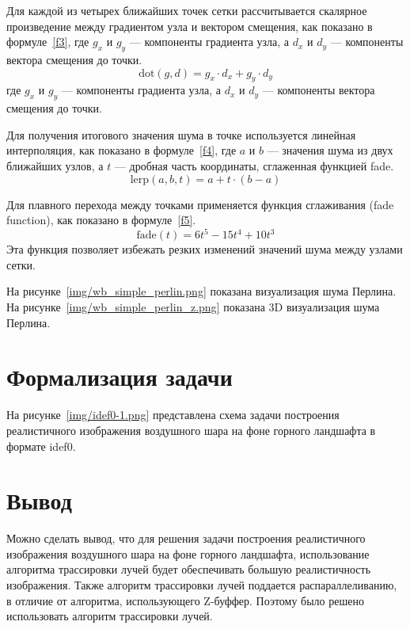 Для каждой из четырех ближайших точек сетки рассчитывается скалярное произведение между градиентом узла и вектором смещения, как показано в формуле~\ref{f3}, где $g_x$ и $g_y$ — компоненты градиента узла, а $d_x$ и $d_y$ — компоненты вектора смещения до точки.
\begin{equation}
\text{dot}(g, d) = g_x \cdot d_x + g_y \cdot d_y
\label{f3}
\end{equation}
где $g_x$ и $g_y$ — компоненты градиента узла, а $d_x$ и $d_y$ — компоненты вектора смещения до точки.

Для получения итогового значения шума в точке используется линейная интерполяция, как показано в формуле~\ref{f4}, где $a$ и $b$ — значения шума из двух ближайших узлов, а $t$ — дробная часть координаты, сглаженная функцией fade.
\begin{equation}
\text{lerp}(a, b, t) = a + t \cdot (b - a)
\label{f4}
\end{equation}


Для плавного перехода между точками применяется функция сглаживания (fade function), как показано в формуле~\ref{f5}.
\begin{equation}
\text{fade}(t) = 6t^5 - 15t^4 + 10t^3
\label{f5}
\end{equation}
Эта функция позволяет избежать резких изменений значений шума между узлами сетки.

На рисунке~\ref{img/wb_simple_perlin.png} показана визуализация шума Перлина. На рисунке~\ref{img/wb_simple_perlin_z.png} показана 3D визуализация шума Перлина.



\section{Формализация задачи}
На рисунке~\ref{img/idef0-1.png} представлена схема задачи построения реалистичного изображения воздушного шара на фоне горного ландшафта в формате idef0.


\section{Вывод}
Можно сделать вывод, что для решения задачи построения реалистичного изображения воздушного шара на фоне горного ландшафта, использование алгоритма трассировки лучей будет обеспечивать большую реалистичность изображения. Также алгоритм трассировки лучей поддается распараллеливанию, в отличие от алгоритма, использующего Z-буффер. Поэтому было решено использовать алгоритм трассировки лучей. 


